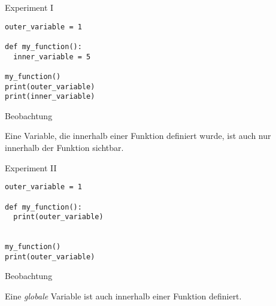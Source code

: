 \begin{fragile}
	
\begin{block}{Experiment I}
\vspace{2pt}

\begin{verbatim}
outer_variable = 1

def my_function(): 
  inner_variable = 5

my_function()
print(outer_variable)
print(inner_variable)
\end{verbatim}


\vspace{12pt}

\end{block}

\begin{exampleblock}{Beobachtung}

\pause 

Eine Variable, die innerhalb einer Funktion definiert wurde, ist auch nur innerhalb der Funktion sichtbar. 
\end{exampleblock}


\end{fragile}

\begin{fragile}
	
\begin{block}{Experiment II}
\vspace{2pt}

\begin{verbatim}
outer_variable = 1

def my_function(): 
  print(outer_variable)
 

my_function()
print(outer_variable)
\end{verbatim}


\vspace{12pt}

\end{block}

\begin{exampleblock}{Beobachtung}

\pause 

Eine \emph{globale} Variable ist auch innerhalb einer Funktion definiert.  
\end{exampleblock}

	
\end{fragile}

